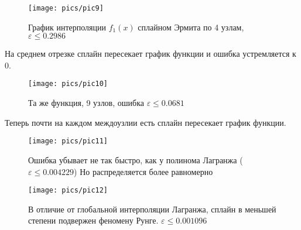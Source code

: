 \begin{figure}[H]
    \centering
    \caption{График интерполяции $f_1(x)$ сплайном Эрмита по 4 узлам, $\varepsilon \le 0.2986$}
    \texttt{[image: pics/pic9]}
    \label{pic:9}
\end{figure}
На среднем отрезке сплайн пересекает график функции и ошибка устремляется к $0$.
\begin{figure}[H]
    \centering
    \caption{Та же функция, 9 узлов, ошибка $\varepsilon \le 0.0681$}
    \texttt{[image: pics/pic10]}
    \label{pic:10}
\end{figure}
Теперь почти на каждом междоузлии есть сплайн пересекает график функции.
\begin{figure}[H]
    \centering
    \caption{Ошибка убывает не так быстро, как у полинома Лагранжа ($\varepsilon \le 0.004229$) Но распределяется более равномерно}
    \texttt{[image: pics/pic11]}
    \label{pic:11}
\end{figure}
\begin{figure}[H]
    \centering
    \caption{В отличие от глобальной интерполяции Лагранжа, сплайн в меньшей степени подвержен феномену Рунге. $\varepsilon \le 0.001096$}
    \texttt{[image: pics/pic12]}
    \label{pic:12}
\end{figure}